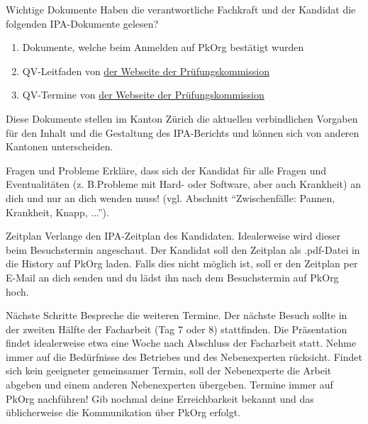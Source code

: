 \begin{taskitem}{Wichtige Dokumente}
  Haben die verantwortliche Fachkraft und der Kandidat die folgenden IPA-Dokumente gelesen?
  \begin{enumerate}
    \item Dokumente, welche beim Anmelden auf PkOrg bestätigt wurden
    \item QV-Leitfaden von \href{https://pk19.ch/informatiker-efz/download-div-files-2/}{der Webseite der Prüfungskommission}
    \item QV-Termine von \href{https://pk19.ch/informatiker-efz/download-div-files-2/}{der Webseite der Prüfungskommission}
  \end{enumerate}
  Diese Dokumente stellen im Kanton Zürich die aktuellen verbindlichen Vorgaben für den Inhalt und die Gestaltung des IPA-Berichts und können sich von anderen Kantonen unterscheiden.
\end{taskitem}
\begin{taskitem}{Fragen und Probleme}
  Erkläre, dass sich der Kandidat für alle Fragen und Eventualitäten (z. B.Probleme mit Hard- oder Software, aber auch Krankheit) an dich und nur an dich wenden muss! (vgl. Abschnitt \enquote{Zwischenfälle: Pannen, Krankheit, Knapp, ...}).
\end{taskitem}
\begin{taskitem}{Zeitplan}
  Verlange den IPA-Zeitplan des Kandidaten. Idealerweise wird dieser beim Besuchstermin angeschaut. Der Kandidat soll den Zeitplan als .pdf-Datei in die History auf PkOrg laden. Falls dies nicht möglich ist, soll er den Zeitplan per E-Mail an dich senden und du lädst ihn nach dem Besuchstermin auf PkOrg hoch.
\end{taskitem}
\begin{taskitem}{Nächste Schritte}
  Bespreche die weiteren Termine. Der nächste Besuch sollte in der zweiten Hälfte der Facharbeit (Tag 7 oder 8) stattfinden. Die Präsentation findet idealerweise etwa eine Woche nach Abschluss der Facharbeit statt. Nehme immer auf die Bedürfnisse des Betriebes und des Nebenexperten rücksicht. Findet sich kein geeigneter gemeinsamer Termin, soll der Nebenexperte die Arbeit abgeben und einem anderen Nebenexperten übergeben. Termine immer auf PkOrg nachführen!
  Gib nochmal deine Erreichbarkeit bekannt und das üblicherweise die Kommunikation über PkOrg erfolgt.
\end{taskitem}